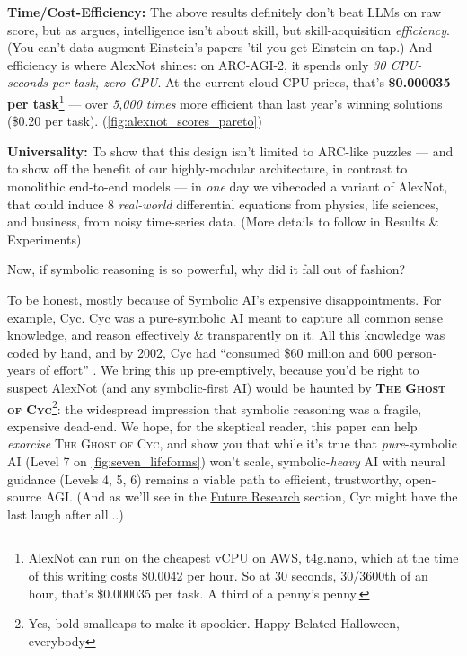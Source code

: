 \documentclass[11pt]{article}
\begin{document}
\textbf{Time/Cost-Efficiency:} The above results definitely don't beat LLMs on raw score, but as \citet{chollet_intelligence_efficiency} argues, intelligence isn't about skill, but skill-acquisition \textit{efficiency}. (You can't data-augment Einstein's papers 'til you get Einstein-on-tap.) And efficiency is where AlexNot shines: on ARC-AGI-2, it spends only \textit{30 CPU-seconds per task, zero GPU}. At the current cloud CPU prices, that's \textbf{\$0.000035 per task}\footnote{AlexNot can run on the cheapest vCPU on AWS, t4g.nano, which at the time of this writing costs \$0.0042 per hour. So at 30 seconds, 30/3600th of an hour, that's \$0.000035 per task. A third of a penny's penny.} — over \textit{5,000 times} more efficient than last year's winning solutions (\$0.20 per task). (\autoref{fig:alexnot_scores_pareto})

\textbf{Universality:} To show that this design isn't limited to ARC-like puzzles — and to show off the benefit of our highly-modular architecture, in contrast to monolithic end-to-end models — in \textit{one} day we vibecoded a variant of AlexNot, that could induce 8 \textit{real-world} differential equations from physics, life sciences, and business, from noisy time-series data. (More details to follow in Results \& Experiments)

Now, if symbolic reasoning is so powerful, why did it fall out of fashion?

To be honest, mostly because of Symbolic AI's expensive disappointments. For example, Cyc. Cyc was a pure-symbolic AI meant to capture all common sense knowledge, and reason effectively \& transparently on it. All this knowledge was coded by hand, and by 2002, Cyc had ``consumed \$60 million and 600 person-years of effort'' \citep{cyc_stanford_2002}. We bring this up pre-emptively, because you'd be right to suspect AlexNot (and any symbolic-first AI) would be haunted by \textbf{\textsc{The Ghost of Cyc}}\footnote{Yes, bold-smallcaps to make it spookier. Happy Belated Halloween, everybody}: the widespread impression that symbolic reasoning was a fragile, expensive dead-end. We hope, for the skeptical reader, this paper can help \textit{exorcise} \textsc{The Ghost of Cyc}, and show you that while it's true that \textit{pure}-symbolic AI (Level 7 on \autoref{fig:seven_lifeforms}) won't scale, symbolic-\textit{heavy} AI with neural guidance (Levels 4, 5, 6) remains a viable path to efficient, trustworthy, open-source AGI. (And as we'll see in the \hyperref[sec:limitations]{Future Research} section, Cyc might have the last laugh after all...)
\end{document}
